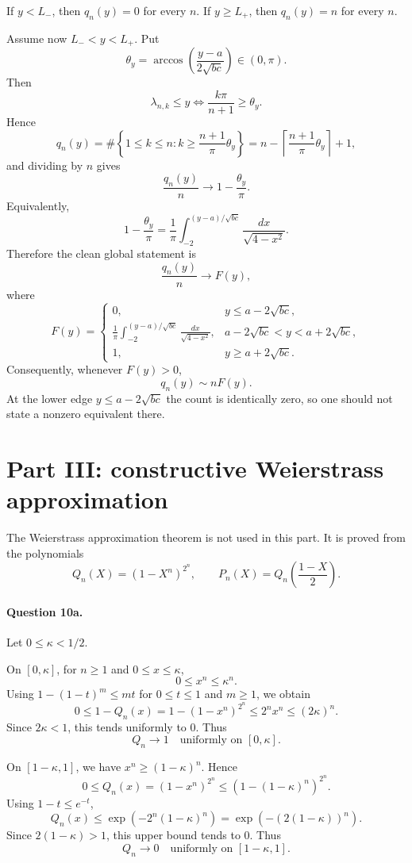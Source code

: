 \documentclass[11pt,a4paper]{article}
\begin{document}
If $y<L_-$, then $q_n(y)=0$ for every $n$.  If $y\ge L_+$, then $q_n(y)=n$ for every $n$.

Assume now $L_-<y<L_+$.  Put
\[
  \theta_y=\arccos\left(\frac{y-a}{2\sqrt{bc}}\right)\in(0,\pi).
\]
Then
\[
  \lambda_{n,k}\le y
  \iff
  \frac{k\pi}{n+1}\ge \theta_y.
\]
Hence
\[
  q_n(y)=\#\left\{1\le k\le n:
  k\ge \frac{n+1}{\pi}\theta_y\right\}
  =n-\left\lceil\frac{n+1}{\pi}\theta_y\right\rceil+1,
\]
and dividing by $n$ gives
\[
  \frac{q_n(y)}n\longrightarrow 1-\frac{\theta_y}{\pi}.
\]
Equivalently,
\[
  1-\frac{\theta_y}{\pi}
  =\frac1\pi\int_{-2}^{(y-a)/\sqrt{bc}}
  \frac{dx}{\sqrt{4-x^2}}.
\]
Therefore the clean global statement is
\[
  \boxed{\frac{q_n(y)}n\longrightarrow F(y),}
\]
where
\[
  F(y)=
  \begin{cases}
  0,& y\le a-2\sqrt{bc},\\[1mm]
  \displaystyle \frac1\pi\int_{-2}^{(y-a)/\sqrt{bc}}
  \frac{dx}{\sqrt{4-x^2}},& a-2\sqrt{bc}<y<a+2\sqrt{bc},\\[3mm]
  1,& y\ge a+2\sqrt{bc}.
  \end{cases}
\]
Consequently, whenever $F(y)>0$,
\[
  \boxed{q_n(y)\sim nF(y).}
\]
At the lower edge $y\le a-2\sqrt{bc}$ the count is identically zero, so one should not state a nonzero equivalent there.

\section{Part III: constructive Weierstrass approximation}

The Weierstrass approximation theorem is not used in this part.  It is proved from the polynomials
\[
  Q_n(X)=(1-X^n)^{2^n},
  \qquad
  P_n(X)=Q_n\left(\frac{1-X}{2}\right).
\]

\paragraph{Question 10a.}
Let $0\le\kappa<1/2$.

On $[0,\kappa]$, for $n\ge1$ and $0\le x\le\kappa$,
\[
  0\le x^n\le\kappa^n.
\]
Using $1-(1-t)^m\le mt$ for $0\le t\le1$ and $m\ge1$, we obtain
\[
  0\le 1-Q_n(x)
  =1-(1-x^n)^{2^n}
  \le 2^n x^n
  \le (2\kappa)^n.
\]
Since $2\kappa<1$, this tends uniformly to $0$.  Thus
\[
  Q_n\longrightarrow1
  \quad\text{uniformly on }[0,\kappa].
\]

On $[1-\kappa,1]$, we have $x^n\ge(1-\kappa)^n$.  Hence
\[
  0\le Q_n(x)
  =(1-x^n)^{2^n}
  \le \left(1-(1-\kappa)^n\right)^{2^n}.
\]
Using $1-t\le e^{-t}$,
\[
  Q_n(x)
  \le \exp\left(-2^n(1-\kappa)^n\right)
  =\exp\left(-(2(1-\kappa))^n\right).
\]
Since $2(1-\kappa)>1$, this upper bound tends to $0$.  Thus
\[
  Q_n\longrightarrow0
  \quad\text{uniformly on }[1-\kappa,1].
\]
\end{document}
